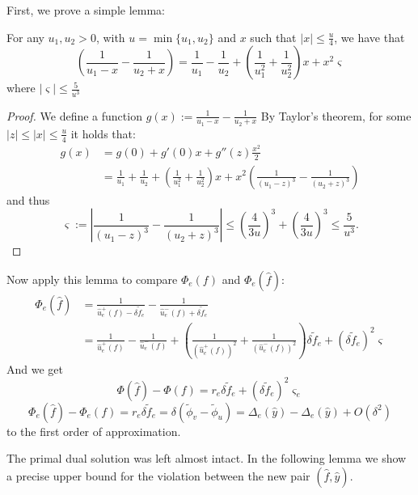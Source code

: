 First, we prove a simple lemma:
\begin{lemma} \label{augmentation_taylor_fact}
For any $u_1,u_2>0$, with  $u=\min\{u_1,u_2\}$ and $x$ such that $|x|\le\frac{u}{4}$, we have that
\[
\left(\frac{1}{u_1-x}-\frac{1}{u_2+x}\right)
= \frac{1}{u_1}-\frac{1}{u_2}+\left(\frac{1}{u_1^2}+\frac{1}{u_2^2}\right)x+x^2\varsigma
\]
where $|\varsigma|\le\frac{5}{u^3}$
\end{lemma}
\begin{proof}
We define a function 
$g(x) := \frac{1}{u_1-x}-\frac{1}{u_2+x}
$
By Taylor's theorem, for some $|z| \le |x| \le \frac{u}{4}$
it holds that:
\[\begin{split}
g(x)
&= g(0)+g'(0)x+g''(z)\frac{x^2}{2}\\
&= \frac{1}{u_1}+\frac{1}{u_2}+\left(\frac{1}{u_1^2}+\frac{1}{u_2^2}\right)x+x^2\left(\frac{1}{(u_1-z)^3}-\frac{1}{(u_2+z)^3}\right)
\end{split}\]
and thus
\[
\varsigma
:= \left|\frac{1}{(u_1-z)^3}-\frac{1}{(u_2+z)^3}\right|
\le \left(\frac{4}{3u}\right)^3+\left(\frac{4}{3u}\right)^3
\le \frac{5}{u^3}.
\]
\end{proof}

Now apply this lemma to compare $\Phi_e(f)$ and $\Phi_e(\hat f)$:
\[\begin{split}
\Phi_e(\hat f)
&= \frac{1}{\hat u_e^+(f)-\delta\tilde  f_e}-\frac{1}{\hat u_e^-(f)+\delta\tilde  f_e}\\
&= \frac{1}{\hat u_e^+(f)}-\frac{1}{\hat u_e^-(f)}+\left(\frac{1}{(\hat u_e^+(f))^2}+\frac{1}{(\hat u_e^-(f))^2}\right)\delta\tilde  f_e+(\delta\tilde f_e)^2\varsigma
\end{split}\]
And we get
\[
\Phi(\hat f)-\Phi(f) = r_e\delta\tilde  f_e+(\delta\tilde  f_e)^2\varsigma_e
\]
\[
\Phi_e(\hat f)-\Phi_e(f)
= r_e\delta\tilde  f_e
= \delta(\tilde{\phi}_v-\tilde{\phi}_u)
= \Delta_e(\hat y)-\Delta_e(\hat y) + O(\delta^2)
\]
to the first order of approximation.

The primal dual solution was left almost intact. In the following lemma we show a precise upper bound for the violation between the new pair $(\hat f,\hat y)$.

